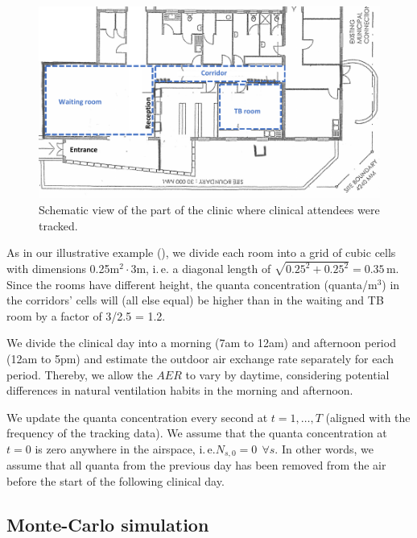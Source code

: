 \documentclass[fleqn,11pt]{wlscirep_supp}
\newcommand\ie{i.\,e.\xspace}
\begin{document}
\begin{figure}[!htpb]
    \centering
    \includegraphics{doc/clinic-schematic-annotated-view.pdf}
    \caption{Schematic view of the part of the clinic where clinical attendees were tracked.}
    \label{fig:clinic}
\end{figure}

As in our illustrative example (), we divide each room into a grid of cubic cells with dimensions 0.25m$^2 \cdot 3$m, \ie a diagonal length of $\sqrt{0.25^2 + 0.25^2} = 0.35$\,m. Since the rooms have different height, the quanta concentration (quanta/m$^3$) in the corridors' cells will (all else equal) be higher than in the waiting and TB room by a factor of 3/2.5 = 1.2. 

We divide the clinical day into a morning (7am to 12am) and afternoon period (12am to 5pm) and estimate the outdoor air exchange rate separately for each period. Thereby, we allow the $AER$ to vary by daytime, considering potential differences in natural ventilation habits in the morning and afternoon. 

We update the quanta concentration every second at $t = 1, \dots, T$ (aligned with the frequency of the tracking data). We assume that the quanta concentration at $t=0$ is zero anywhere in the airspace, \ie $N_{s,0} = 0 ~~ \forall s$. In other words, we assume that all quanta from the previous day has been removed from the air before the start of the following clinical day. 


\subsection{Monte-Carlo simulation}
\end{document}
